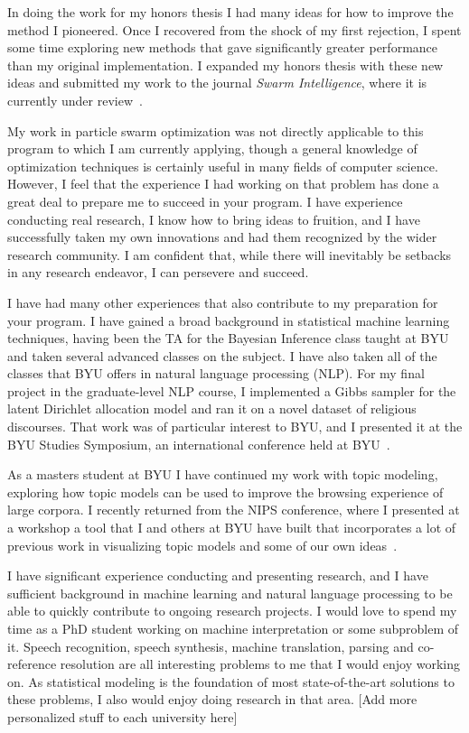 \documentclass[onecolumn, 12pt]{article}
\begin{document}
In doing the work for my honors thesis I had many ideas for how to improve the
method I pioneered.  Once I recovered from the shock of my first rejection, I
spent some time exploring new methods that gave significantly greater
performance than my original implementation.  I expanded my honors thesis with
these new ideas and submitted my work to the journal \emph{Swarm Intelligence},
where it is currently under
review~\cite{gardner-2010-speculative-approach-to-parallelization-pso}.

My work in particle swarm optimization was not directly applicable to this
program to which I am currently applying, though a general knowledge of
optimization techniques is certainly useful in many fields of computer science.
However, I feel that the experience I had working on that problem has done a
great deal to prepare me to succeed in your program.  I have experience
conducting real research, I know how to bring ideas to fruition, and I have
successfully taken my own innovations and had them recognized by the wider
research community.  I am confident that, while there will inevitably be
setbacks in any research endeavor, I can persevere and succeed.

I have had many other experiences that also contribute to my preparation for
your program.  I have gained a broad background in statistical machine learning
techniques, having been the TA for the Bayesian Inference class taught at BYU
and taken several advanced classes on the subject.  I have also taken all of
the classes that BYU offers in natural language processing (NLP).  For my final
project in the graduate-level NLP course, I implemented a Gibbs sampler for the
latent Dirichlet allocation model and ran it on a novel dataset of religious
discourses.  That work was of particular interest to BYU, and I presented it at
the BYU Studies Symposium, an international conference held at
BYU~\cite{gardner-2010-general-conference-topics}.

As a masters student at BYU I have continued my work with topic modeling,
exploring how topic models can be used to improve the browsing experience of
large corpora.  I recently returned from the NIPS conference, where I presented
at a workshop a tool that I and others at BYU have built that incorporates a
lot of previous work in visualizing topic models and some of our own
ideas~\cite{gardner-2010-topic-browser}.

I have significant experience conducting and presenting research, and I have
sufficient background in machine learning and natural language processing to be
able to quickly contribute to ongoing research projects.  I would love to spend
my time as a PhD student working on machine interpretation or some subproblem
of it.  Speech recognition, speech synthesis, machine translation, parsing and
co-reference resolution are all interesting problems to me that I would enjoy
working on.  As statistical modeling is the foundation of most state-of-the-art
solutions to these problems, I also would enjoy doing research in that area.
[Add more personalized stuff to each university here]



\end{document}
